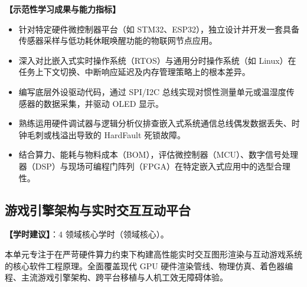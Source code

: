 \textbf{【示范性学习成果与能力指标】}
\begin{itemize}
    \item 针对特定硬件微控制器平台（如 STM32、ESP32），独立设计并开发一套具备传感器采样与低功耗休眠唤醒功能的物联网节点应用。
    \item 深入对比嵌入式实时操作系统（RTOS）与通用分时操作系统（如 Linux）在任务上下文切换、中断响应延迟及内存管理策略上的根本差异。
    \item 编写底层外设驱动代码，通过 SPI/I2C 总线实现对惯性测量单元或温湿度传感器的数据采集，并驱动 OLED 显示。
    \item 熟练运用硬件调试器与逻辑分析仪排查嵌入式系统通信总线偶发数据丢失、时钟毛刺或栈溢出导致的 HardFault 死锁故障。
    \item 结合算力、能耗与物料成本（BOM），评估微控制器（MCU）、数字信号处理器（DSP）与现场可编程门阵列（FPGA）在特定嵌入式应用中的选型合理性。
\end{itemize}

\subsection{游戏引擎架构与实时交互互动平台}
\textbf{【学时建议】}：4 领域核心学时（领域核心）。

本单元专注于在严苛硬件算力约束下构建高性能实时交互图形渲染与互动游戏系统的核心软件工程原理。全面覆盖现代 GPU 硬件渲染管线、物理仿真、着色器编程、主流游戏引擎架构、跨平台移植与人机工效无障碍体验。

